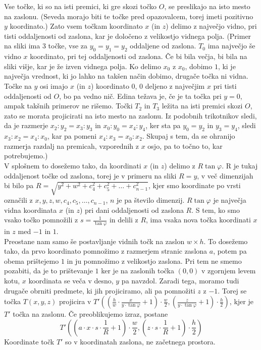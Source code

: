 \documentclass[a4paper, 12px]{article}
\begin{document}
    Vse točke, ki so na isti premici, ki gre skozi točko $O$, se preslikajo na isto mesto na zaslonu.
    (Seveda morajo biti te točke pred opazovalcem, torej imeti pozitivno $y$ koordinato.)
    Zato vsem točkam koordinato $x$ (in $z$) delimo z največjo vidno, pri tisti oddaljenosti od zaslona, kar je
    določeno z velikostjo vidnega polja.
    (Primer na sliki ima 3 točke, vse za $y_0 = y_1 = y_2$ oddaljene od zaslona. $T_0$ ima največjo še vidno $x$
    koordinato, pri tej oddaljenosti od zaslona. Če bi bila večja, bi bila na sliki višje, kar je že izven vidnega polja.
    Ko delimo $x_0$ z $x_0$, dobimo $1$, ki je največja vrednost, ki jo lahko na takšen način dobimo, drugače točka ni vidna.
    Točke na $y$ osi imajo $x$ (in $z$) koordinato $0$, $0$ deljeno z največjim $x$ pri tisti oddaljenosti od $O$, 
    bo pa vedno nič. Edina težava je, če je ta točka pri $y = 0$, ampak takšnih primerov ne rišemo.
    Točki $T_2$ in $T_3$ ležita na isti premici skozi $O$, zato se morata projicirati na isto mesto na zaslonu.
    Iz podobnih trikotnikov sledi, da je razmerje $x_2 : y_2 = x_3 : y_3$ in $x_0 : y_0 = x_4 : y_4$,
    ker sta pa $y_0 = y_2$ in $y_3 = y_4$, sledi $x_3 : x_2 = x_4 : x_0$, kar pa pomeni $x_4 : x_3 = x_0 : x_2$.
    Skupaj s tem, da se ohranijo razmerja razdalj na premicah, vzporednih z $x$ osjo, pa to točno to, kar potrebujemo.)\\

    V splošnem to dosežemo tako, da koordinati $x$ (in $z$) delimo z $R\tan{\varphi}$. R je tukaj oddaljenost točke od zaslona,
    torej je v primeru na sliki $R = y$, v več dimenzijah bi bilo pa $R = \sqrt{y^2 + w^2 + c_4^2 + c_5^2 + \dots + c_{n-1}^2}$,
    kjer smo koordinate po vrsti označili z $x, y, z, w, c_4, c_5, \dots, c_{n-1}$, $n$ je pa število dimenzij.
    $R\tan{\varphi}$ je največja vidna koordinata $x$ (in $z$) pri dani oddaljenosti od zaslona $R$.
    S tem, ko smo vsako točko pomnožili z $s = \frac{1}{\tan{\varphi}}$ in delili z $R$, ima vsaka nova točka koordinati $x$ in $z$ med $-1$ in $1$. \\

    Preostane nam samo še postavljanje vidnih točk na zaslon $w \times h$. To dosežemo tako, da prvo koordinato pomnožimo
    z razmerjem stranic zaslona $a$, potem pa obema prištejemo $1$ in ju pomnožimo z velikostjo zaslona. Pri tem ne smemo
    pozabiti, da je to prištevanje $1$ ker je na zaslonih točka $\left(0, 0\right)$ v zgornjem levem kotu, $x$ koordinata
    se veča v desno, $y$ pa navzdol. Zaradi tega, moramo tudi drugače obrniti predmete, ki jih projiciramo, ali pa pomnožiti
    $z$ z $-1$. Torej se točka $T\left(x, y, z\right)$ projicira v 
    $T'\left(\left(\frac{h}{w} \cdot \frac{x}{y \cdot \tan{\varphi}} + 1\right) \cdot \frac{w}{2},
    \left(\frac{z}{y \cdot \tan{\varphi}} + 1\right) \cdot \frac{h}{2} \right)$, 
    kjer je $T'$ točka na zaslonu. Če preoblikujemo izraz, postane 
    $$T'\left(\left(a \cdot x \cdot s \cdot \frac{1}{R} + 1\right) \cdot \frac{w}{2},
    \left(z \cdot s \cdot \frac{1}{R} + 1\right) \cdot \frac{h}{2} \right)$$
    Koordinate točk $T'$ so v koordinatah zaslona, ne začetnega prostora.
    \cite{ProjectionVideo}
\end{document}
